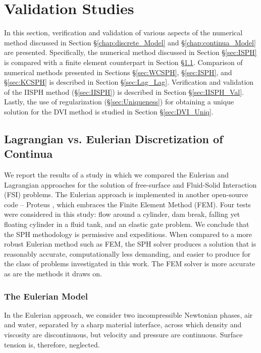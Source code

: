 \chapter{Validation Studies}
\label{chap:experiments}
In this section, verification and validation of various aspects of the numerical method discussed in Section \S\ref{chap:discrete_Model} and \S\ref{chap:continua_Model} are presented. Specifically, the numerical method discussed in Section \S\ref{sec:ISPH}  is compared with a finite element counterpart in Section \S\ref{sec:Eu_La}. Comparison of numerical methods presented in Sections \S\ref{sec:WCSPH}, \S\ref{sec:ISPH}, and \S\ref{sec:KCSPH} is described in Section \S\ref{sec:Lag_Lag}. Verification and validation of the IISPH method (\S\ref{sec:IISPH}) is described in Section \S\ref{sec:IISPH_Val}. Lastly, the use of regularization (\S\ref{sec:Uniqueness}) for obtaining a unique solution for the DVI method is studied in Section \S\ref{sec:DVI_Uniq}. 



\section{Lagrangian vs. Eulerian Discretization of Continua}\label{sec:Eu_La}
We report the results of a study in which we compared the Eulerian and Lagrangian approaches for the solution of free-surface and Fluid-Solid Interaction (FSI) problems. The Eulerian approach is implemented in another open-source code -- Proteus \cite{proteus_1_6_1}, which embraces the Finite Element Method (FEM). Four tests were considered in this study: flow around a cylinder, dam break, falling yet floating cylinder in a fluid tank, and an elastic gate problem. We conclude that the SPH methodology is permissive and expeditious. When compared to a more robust Eulerian method such as FEM, the SPH solver produces a solution that is reasonably accurate, computationally less demanding, and easier to produce for the class of problems investigated in this work.  The FEM solver is more accurate as are the methods it draws on.


\subsection{The Eulerian Model}\label{sec:Eulerian}
In the Eulerian approach, we consider two incompressible Newtonian phases, air and water, separated by a sharp material interface, across which density and viscosity are discontinuous, but velocity and pressure are continuous. Surface tension is, therefore, neglected. 


